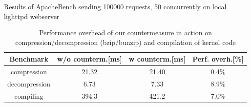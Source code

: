 \begin{center}
\begin{table}
\caption{{Results of ApacheBench sending 100000 requests, 50 concurrently on local lighttpd webserver}}
\label{apache}
\end{table}
\end{center}


\begin{table}[htdp]
\begin{center}
\begin{tabular}{|c|c|c|c|}
\hline
\bf{Benchmark} & \bf{w/o counterm.}[ms] & \bf{w counterm.}[ms] & \bf{Perf. overh.}[\%] \\
\hline
compression   & 21.32  & 21.40  & 0.4\% \\
\hline
decompression & 6.73   &  7.33  & 8.9\%\\
\hline
compiling   & 394.3  & 421.2  & 7.0\% \\
\hline
\end{tabular}
\end{center}
\caption{{Performance overhead of our countermeasure in action on compression/decompression (bzip/bunzip) and compilation of kernel code}}
\label{kernel}
\end{table}

